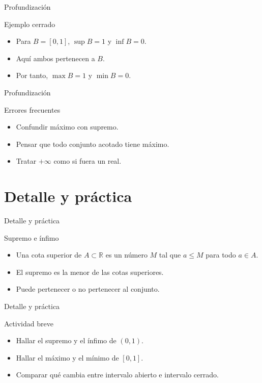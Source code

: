 \documentclass[aspectratio=169,11pt]{beamer}
\begin{document}
\begin{frame}{Profundización}
\begin{block}{Ejemplo cerrado}
\begin{itemize}
  \item Para \(B=[0,1]\), \(\sup B=1\) y \(\inf B=0\).
  \item Aquí ambos pertenecen a \(B\).
  \item Por tanto, \(\max B=1\) y \(\min B=0\).
\end{itemize}
\end{block}
\end{frame}

\begin{frame}{Profundización}
\begin{block}{Errores frecuentes}
\begin{itemize}
  \item Confundir máximo con supremo.
  \item Pensar que todo conjunto acotado tiene máximo.
  \item Tratar \(+\infty\) como si fuera un real.
\end{itemize}
\end{block}
\end{frame}


\section{Detalle y práctica}

\begin{frame}{Detalle y práctica}
\begin{block}{Supremo e ínfimo}
\begin{itemize}
  \item Una cota superior de \(A\subset\mathbb{R}\) es un número \(M\) tal que \(a\leq M\) para todo \(a\in A\).
  \item El supremo es la menor de las cotas superiores.
  \item Puede pertenecer o no pertenecer al conjunto.
\end{itemize}
\end{block}
\end{frame}

\begin{frame}{Detalle y práctica}
\begin{block}{Actividad breve}
\begin{itemize}
  \item Hallar el supremo y el ínfimo de \((0,1)\).
  \item Hallar el máximo y el mínimo de \([0,1]\).
  \item Comparar qué cambia entre intervalo abierto e intervalo cerrado.
\end{itemize}
\end{block}
\end{frame}
\end{document}
